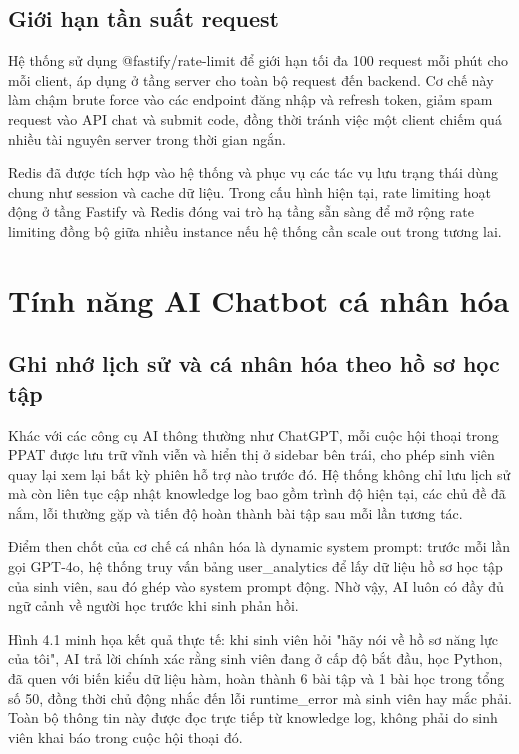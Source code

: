 \documentclass[../main.tex]{subfiles}
\begin{document}
\subsection{Giới hạn tần suất request}

Hệ thống sử dụng @fastify/rate-limit để giới hạn tối đa 100 request mỗi phút cho mỗi client, áp dụng ở tầng server cho toàn bộ request đến backend. Cơ chế này làm chậm brute force vào các endpoint đăng nhập và refresh token, giảm spam request vào API chat và submit code, đồng thời tránh việc một client chiếm quá nhiều tài nguyên server trong thời gian ngắn.

Redis đã được tích hợp vào hệ thống và phục vụ các tác vụ lưu trạng thái dùng chung như session và cache dữ liệu. Trong cấu hình hiện tại, rate limiting hoạt động ở tầng Fastify và Redis đóng vai trò hạ tầng sẵn sàng để mở rộng rate limiting đồng bộ giữa nhiều instance nếu hệ thống cần scale out trong tương lai.

\section{Tính năng AI Chatbot cá nhân hóa}

\subsection{Ghi nhớ lịch sử và cá nhân hóa theo hồ sơ học tập}

Khác với các công cụ AI thông thường như ChatGPT, mỗi cuộc hội thoại trong PPAT được lưu trữ vĩnh viễn và hiển thị ở sidebar bên trái, cho phép sinh viên quay lại xem lại bất kỳ phiên hỗ trợ nào trước đó. Hệ thống không chỉ lưu lịch sử mà còn liên tục cập nhật knowledge log bao gồm trình độ hiện tại, các chủ đề đã nắm, lỗi thường gặp và tiến độ hoàn thành bài tập sau mỗi lần tương tác.

Điểm then chốt của cơ chế cá nhân hóa là dynamic system prompt: trước mỗi lần gọi GPT-4o, hệ thống truy vấn bảng user\_analytics để lấy dữ liệu hồ sơ học tập của sinh viên, sau đó ghép vào system prompt động. Nhờ vậy, AI luôn có đầy đủ ngữ cảnh về người học trước khi sinh phản hồi.

Hình 4.1 minh họa kết quả thực tế: khi sinh viên hỏi "hãy nói về hồ sơ năng lực của tôi", AI trả lời chính xác rằng sinh viên đang ở cấp độ bắt đầu, học Python, đã quen với biến kiểu dữ liệu hàm, hoàn thành 6 bài tập và 1 bài học trong tổng số 50, đồng thời chủ động nhắc đến lỗi runtime\_error mà sinh viên hay mắc phải. Toàn bộ thông tin này được đọc trực tiếp từ knowledge log, không phải do sinh viên khai báo trong cuộc hội thoại đó.
\end{document}
